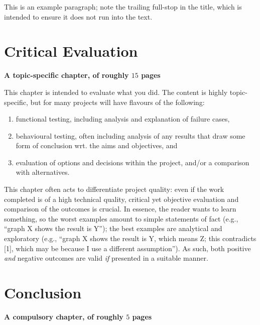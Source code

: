 \documentclass[ %
                    author={Dillon Keith Diep},
                supervisor={Dr. Carl Henrik Ek},
                    degree={MEng},
                     title={Assisted Content Generation for 3D Hair Geometry},
                  subtitle={[INCOMPLETE DRAFT, CONTAINS NOTES FROM RESEARCH]},
                      type={Research},
                      year={2014} ]{dissertation}
\begin{document}
This is an example paragraph; note the trailing full-stop in the title,
which is intended to ensure it does not run into the text.


\chapter{Critical Evaluation}
\label{chap:evaluation}

{\bf A topic-specific chapter, of roughly $15$ pages} 
\vspace{1cm} 

\noindent
This chapter is intended to evaluate what you did.  The content is highly 
topic-specific, but for many projects will have flavours of the following:

\begin{enumerate}
\item functional  testing, including analysis and explanation of failure 
      cases,
\item behavioural testing, often including analysis of any results that 
      draw some form of conclusion wrt. the aims and objectives,
      and
\item evaluation of options and decisions within the project, and/or a
      comparison with alternatives.
\end{enumerate}

\noindent
This chapter often acts to differentiate project quality: even if the work
completed is of a high technical quality, critical yet objective evaluation 
and comparison of the outcomes is crucial.  In essence, the reader wants to
learn something, so the worst examples amount to simple statements of fact 
(e.g., ``graph X shows the result is Y''); the best examples are analytical 
and exploratory (e.g., ``graph X shows the result is Y, which means Z; this 
contradicts [1], which may be because I use a different assumption'').  As 
such, both positive {\em and} negative outcomes are valid {\em if} presented 
in a suitable manner.


\chapter{Conclusion}
\label{chap:conclusion}

{\bf A compulsory chapter,     of roughly $5$ pages} 
\vspace{1cm} 
\end{document}
